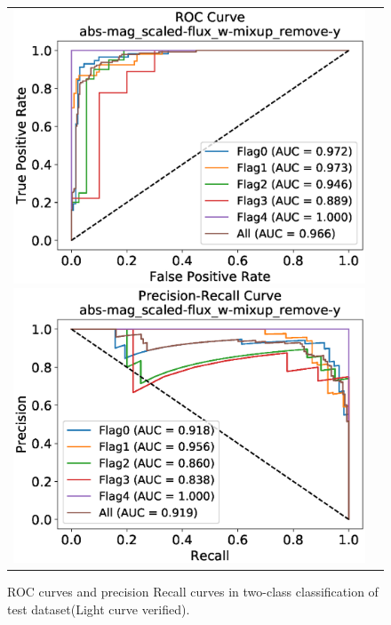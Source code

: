 \documentclass[useamsfonts]{pasj01}
\begin{document}
%
%
%
\begin{figure}[ht]
    \begin{tabular}{cc}
        \begin{minipage}{0.5\hsize}
            \begin{center}
                \includegraphics[width=\columnwidth]{figures/10_abs-mag_scaled-flux_w-mixup_remove-y_predictions_test_ROC_noedge_spec.eps}
            \end{center}
        \end{minipage}
        \begin{minipage}{0.5\hsize}
            \begin{center}
                \includegraphics[width=\columnwidth]{figures/10_abs-mag_scaled-flux_w-mixup_remove-y_predictions_test_PreRec_noedge_spec.eps}
            \end{center}
        \end{minipage}
    \end{tabular}
    \caption{%
  ROC curves and precision Recall curves in two-class classification of test dataset(Light curve verified).
}%
    \label{fig:h2_test_gold}
\end{figure}
\end{document}
